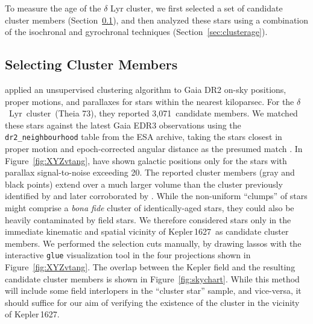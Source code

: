 \documentclass[12pt,modern,twocolumn,tighten,linenumbers,trackchanges]{aastex63}
\newcommand{\cn}{$\delta$\ Lyr\ cluster} %
\newcommand{\sn}{Kepler\,1627} %
\newcommand{\noriginal}{3{,}071} %
\begin{document}
To measure the age of the $\delta$ Lyr cluster, we first selected a
set of candidate cluster members
(Section~\ref{sec:kinematicselection}), and then analyzed these stars
using a combination of the isochronal and gyrochronal techniques
(Section~\ref{sec:clusterage}).


\subsection{Selecting Cluster Members}
\label{sec:kinematicselection}

\citet{KounkelCovey2019} applied an unsupervised clustering algorithm
to Gaia DR2 on-sky positions, proper motions, and parallaxes for stars
within the nearest kiloparsec.  For the \cn\ (Theia 73), they reported
\noriginal\ candidate members.  We matched these stars against the
latest Gaia EDR3 observations using the \texttt{dr2\_neighbourhood}
table from the ESA archive,
taking the stars closest in proper motion and epoch-corrected angular
distance as the presumed match \citep{gaia_collaboration_2021_edr3}.
In Figure~\ref{fig:XYZvtang}, have shown galactic positions only for
the stars with parallax signal-to-noise exceeding 20.  The reported
cluster members (gray and black points) extend over a much larger
volume than the cluster previously identified by
\citet{stephenson_possible_1959} and later corroborated by
\citet{eggen_photometric_1968}.  While the non-uniform ``clumps'' of
stars might comprise a {\it bona fide} cluster of identically-aged
stars, they could also be heavily contaminated by field stars.  We
therefore considered stars only in the immediate kinematic and spatial
vicinity of \sn\ as candidate cluster members.  We performed the
selection cuts manually, by drawing lassos with the interactive
\texttt{glue} visualization tool \citep{beaumont_2014_13866} in the
four projections shown in Figure~\ref{fig:XYZvtang}.  The overlap
between the Kepler field and the resulting candidate cluster members
is shown in Figure~\ref{fig:skychart}.  While this method will include
some field interlopers in the ``cluster star'' sample, and vice-versa,
it should suffice for our aim of verifying the existence of the
cluster in the vicinity of \sn.
\end{document}
